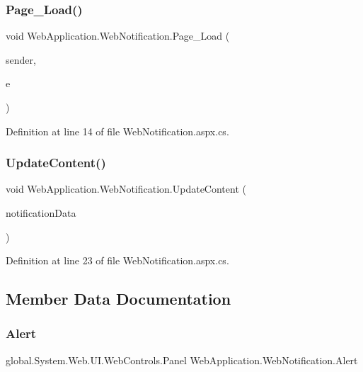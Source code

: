 \subsubsection{\texorpdfstring{Page\_Load()}{Page\_Load()}}
{\footnotesize\ttfamily void Web\+Application.\+Web\+Notification.\+Page\+\_\+\+Load (\begin{DoxyParamCaption}\item[{object}]{sender,  }\item[{Event\+Args}]{e }\end{DoxyParamCaption})\hspace{0.3cm}{\ttfamily [protected]}}



Definition at line 14 of file Web\+Notification.\+aspx.\+cs.

\mbox{\label{classWebApplication_1_1WebNotification_a1e5658d5d3268498cc2bfb560b4851b8}} 
\subsubsection{\texorpdfstring{UpdateContent()}{UpdateContent()}}
{\footnotesize\ttfamily void Web\+Application.\+Web\+Notification.\+Update\+Content (\begin{DoxyParamCaption}\item[{\mbox{\hyperlink{classWebApplication_1_1Framework_1_1NotificationData}{Notification\+Data}}}]{notification\+Data }\end{DoxyParamCaption})}



Definition at line 23 of file Web\+Notification.\+aspx.\+cs.



\subsection{Member Data Documentation}
\mbox{\label{classWebApplication_1_1WebNotification_aad27a714fac49b6503c5e3f5184cc0ea}} 
\subsubsection{\texorpdfstring{Alert}{Alert}}
{\footnotesize\ttfamily global.\+System.\+Web.\+U\+I.\+Web\+Controls.\+Panel Web\+Application.\+Web\+Notification.\+Alert\hspace{0.3cm}{\ttfamily [protected]}}



